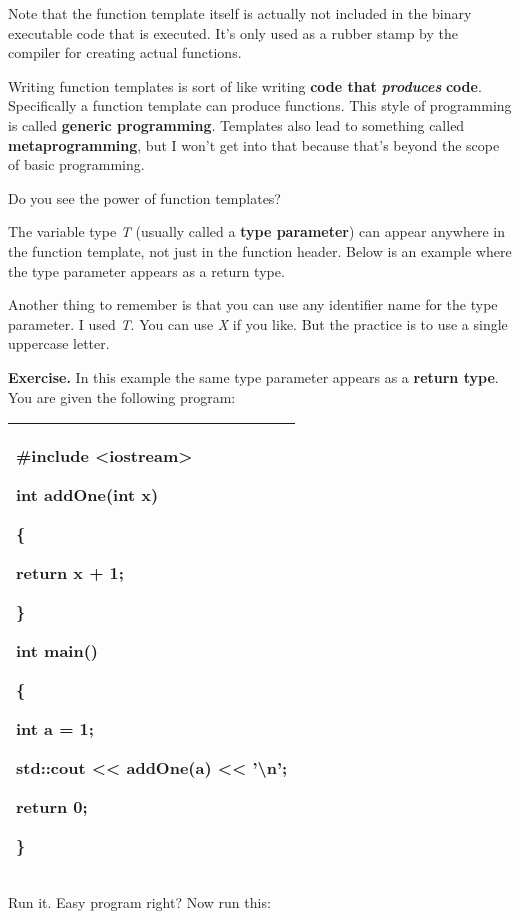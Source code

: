 \documentclass[
]{article}
\begin{document}
Note that the function template itself is actually not included in the
binary executable code that is executed. It's only used as a rubber
stamp by the compiler for creating actual functions.

Writing function templates is sort of like writing \textbf{code that
}\emph{\textbf{produces}}\textbf{ code}. Specifically a function
template can produce functions. This style of programming is called
\textbf{generic programming}. Templates also lead to something called
\textbf{metaprogramming}, but I won't get into that because that's
beyond the scope of basic programming.

Do you see the power of function templates?

The variable type \emph{T} (usually called a \textbf{type parameter})
can appear anywhere in the function template, not just in the function
header. Below is an example where the type parameter appears as a return
type.

Another thing to remember is that you can use any identifier name for
the type parameter. I used \emph{T}. You can use \emph{X} if you like.
But the practice is to use a single uppercase letter.

\textbf{Exercise.} In this example the same type parameter appears as a
\textbf{return type}. You are given the following program:

\begin{longtable}[]{@{}l@{}}
\toprule
\endhead
\begin{minipage}[t]{0.97\columnwidth}\raggedright
\#include \textless iostream\textgreater{}

int addOne(int x)

\{

return x + 1;

\}

int main()

\{

int a = 1;

std::cout \textless\textless{} addOne(a) \textless\textless{}
'\textbackslash n';

return 0;

\}\strut
\end{minipage}\tabularnewline
\bottomrule
\end{longtable}

Run it. Easy program right? Now run this:
\end{document}
